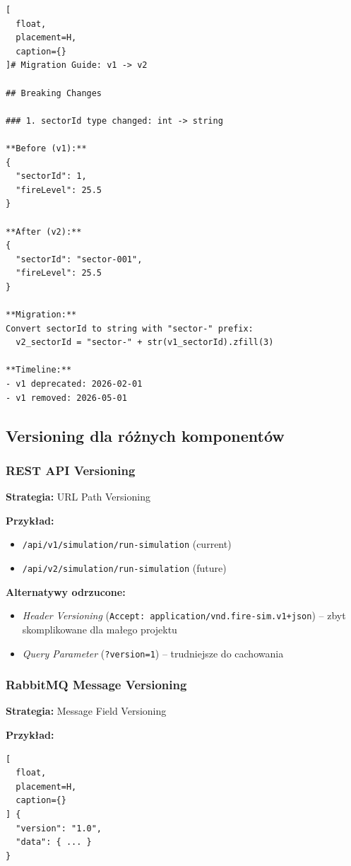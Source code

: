 \begin{lstlisting}[
  float,
  placement=H,
  caption={}
]# Migration Guide: v1 -> v2

## Breaking Changes

### 1. sectorId type changed: int -> string

**Before (v1):**
{
  "sectorId": 1,
  "fireLevel": 25.5
}

**After (v2):**
{
  "sectorId": "sector-001",
  "fireLevel": 25.5
}

**Migration:**
Convert sectorId to string with "sector-" prefix:
  v2_sectorId = "sector-" + str(v1_sectorId).zfill(3)

**Timeline:**
- v1 deprecated: 2026-02-01
- v1 removed: 2026-05-01
\end{lstlisting}

\subsection{Versioning dla różnych komponentów}

\subsubsection{REST API Versioning}

\textbf{Strategia:} URL Path Versioning

\textbf{Przykład:}
\begin{itemize}
    \item \texttt{/api/v1/simulation/run-simulation} (current)
    \item \texttt{/api/v2/simulation/run-simulation} (future)
\end{itemize}

\textbf{Alternatywy odrzucone:}
\begin{itemize}
    \item \textit{Header Versioning} (\texttt{Accept: application/vnd.fire-sim.v1+json}) -- zbyt skomplikowane dla małego projektu
    \item \textit{Query Parameter} (\texttt{?version=1}) -- trudniejsze do cachowania
\end{itemize}

\subsubsection{RabbitMQ Message Versioning}

\textbf{Strategia:} Message Field Versioning

\textbf{Przykład:}
\begin{lstlisting}[
  float,
  placement=H,
  caption={}
] {
  "version": "1.0",
  "data": { ... }
}
\end{lstlisting}

